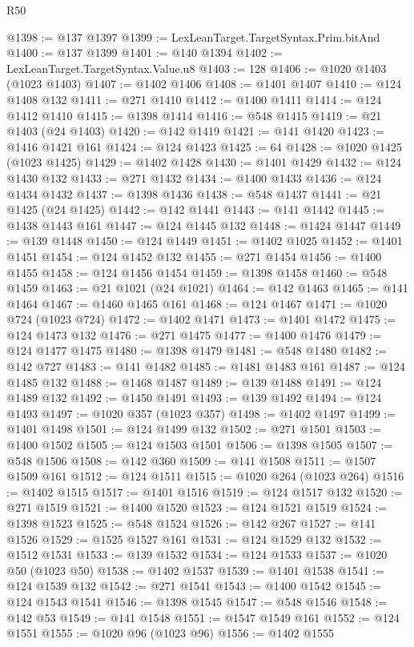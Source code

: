 \begin{lexlean}{R50}
\begin{coremodule}
@1398 := @137 @1397
@1399 := LexLeanTarget.TargetSyntax.Prim.bitAnd
@1400 := @137 @1399
@1401 := @140 @1394
@1402 := LexLeanTarget.TargetSyntax.Value.u8
@1403 := 128
@1406 := @1020 @1403 (@1023 @1403)
@1407 := @1402 @1406
@1408 := @1401 @1407
@1410 := @124 @1408 @132
@1411 := @271 @1410
@1412 := @1400 @1411
@1414 := @124 @1412 @1410
@1415 := @1398 @1414
@1416 := @548 @1415
@1419 := @21 @1403 (@24 @1403)
@1420 := @142 @1419
@1421 := @141 @1420
@1423 := @1416 @1421 @161
@1424 := @124 @1423
@1425 := 64
@1428 := @1020 @1425 (@1023 @1425)
@1429 := @1402 @1428
@1430 := @1401 @1429
@1432 := @124 @1430 @132
@1433 := @271 @1432
@1434 := @1400 @1433
@1436 := @124 @1434 @1432
@1437 := @1398 @1436
@1438 := @548 @1437
@1441 := @21 @1425 (@24 @1425)
@1442 := @142 @1441
@1443 := @141 @1442
@1445 := @1438 @1443 @161
@1447 := @124 @1445 @132
@1448 := @1424 @1447
@1449 := @139 @1448
@1450 := @124 @1449
@1451 := @1402 @1025
@1452 := @1401 @1451
@1454 := @124 @1452 @132
@1455 := @271 @1454
@1456 := @1400 @1455
@1458 := @124 @1456 @1454
@1459 := @1398 @1458
@1460 := @548 @1459
@1463 := @21 @1021 (@24 @1021)
@1464 := @142 @1463
@1465 := @141 @1464
@1467 := @1460 @1465 @161
@1468 := @124 @1467
@1471 := @1020 @724 (@1023 @724)
@1472 := @1402 @1471
@1473 := @1401 @1472
@1475 := @124 @1473 @132
@1476 := @271 @1475
@1477 := @1400 @1476
@1479 := @124 @1477 @1475
@1480 := @1398 @1479
@1481 := @548 @1480
@1482 := @142 @727
@1483 := @141 @1482
@1485 := @1481 @1483 @161
@1487 := @124 @1485 @132
@1488 := @1468 @1487
@1489 := @139 @1488
@1491 := @124 @1489 @132
@1492 := @1450 @1491
@1493 := @139 @1492
@1494 := @124 @1493
@1497 := @1020 @357 (@1023 @357)
@1498 := @1402 @1497
@1499 := @1401 @1498
@1501 := @124 @1499 @132
@1502 := @271 @1501
@1503 := @1400 @1502
@1505 := @124 @1503 @1501
@1506 := @1398 @1505
@1507 := @548 @1506
@1508 := @142 @360
@1509 := @141 @1508
@1511 := @1507 @1509 @161
@1512 := @124 @1511
@1515 := @1020 @264 (@1023 @264)
@1516 := @1402 @1515
@1517 := @1401 @1516
@1519 := @124 @1517 @132
@1520 := @271 @1519
@1521 := @1400 @1520
@1523 := @124 @1521 @1519
@1524 := @1398 @1523
@1525 := @548 @1524
@1526 := @142 @267
@1527 := @141 @1526
@1529 := @1525 @1527 @161
@1531 := @124 @1529 @132
@1532 := @1512 @1531
@1533 := @139 @1532
@1534 := @124 @1533
@1537 := @1020 @50 (@1023 @50)
@1538 := @1402 @1537
@1539 := @1401 @1538
@1541 := @124 @1539 @132
@1542 := @271 @1541
@1543 := @1400 @1542
@1545 := @124 @1543 @1541
@1546 := @1398 @1545
@1547 := @548 @1546
@1548 := @142 @53
@1549 := @141 @1548
@1551 := @1547 @1549 @161
@1552 := @124 @1551
@1555 := @1020 @96 (@1023 @96)
@1556 := @1402 @1555

\end{coremodule}
\end{lexlean}
